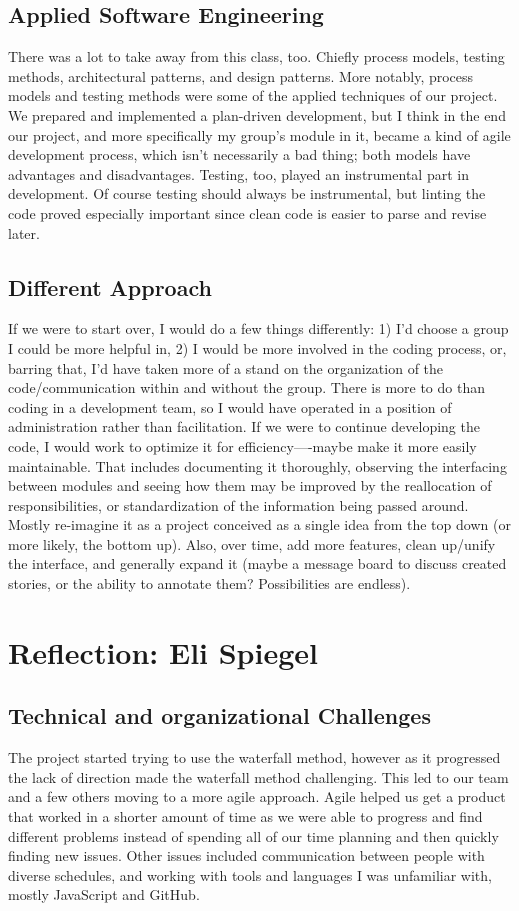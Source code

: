 \documentclass[a4paper]{article}
\begin{document}
\subsection{Applied Software Engineering}
There was a lot to take away from this class, too. Chiefly process models, testing methods, architectural patterns, and design patterns. More notably, process models and testing methods were some of the applied techniques of our project. We prepared and implemented a plan-driven development, but I think in the end our project, and more specifically my group's module in it, became a kind of agile development process, which isn't necessarily a bad thing; both models have advantages and disadvantages. Testing, too, played an instrumental part in development. Of course testing should always be instrumental, but linting the code proved especially important since clean code is easier to parse and revise later.

\subsection{Different Approach}
If we were to start over, I would do a few things differently: 1) I'd choose a group I could be more helpful in, 2) I would be more involved in the coding process, or, barring that, I'd have taken more of a stand on the organization of the code/communication within and without the group. There is more to do than coding in a development team, so I would have operated in a position of administration rather than facilitation. If we were to continue developing the code, I would work to optimize it for efficiency—-maybe make it more easily maintainable. That includes documenting it thoroughly, observing the interfacing between modules and seeing how them may be improved by the reallocation of responsibilities, or standardization of the information being passed around. Mostly re-imagine it as a project conceived as a single idea from the top down (or more likely, the bottom up). Also, over time, add more features, clean up/unify the interface, and generally expand it (maybe a message board to discuss created stories, or the ability to annotate them? Possibilities are endless).

\section{Reflection: Eli Spiegel}
\subsection{Technical and organizational Challenges}
The project started trying to use the waterfall method, however as it progressed the lack of direction made the waterfall method challenging. This led to our team and a few others moving to a more agile approach. Agile helped us get a product that worked in a shorter amount of time as we were able to progress and find different problems instead of spending all of our time planning and then quickly finding new issues. Other issues included communication between people with diverse schedules, and working with tools and languages I was unfamiliar with, mostly JavaScript and GitHub.
\end{document}
